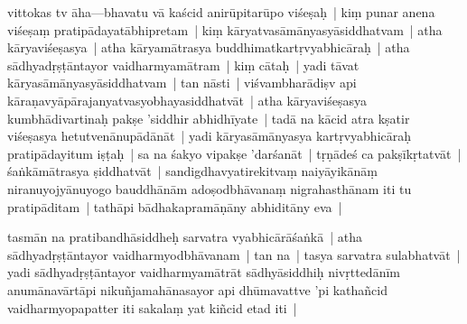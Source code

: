 \documentclass[article,a4paper]{memoir}
\begin{document}
	  \pstart {}\label{sarit__ratnakīrtinibandhāvali__141640}vittokas tv ā\-ha—bhavatu vā\- kaścid anirū\-pitarū\-po viśeṣaḥ | kiṃ punar anena viśeṣaṃ pratipā\-dayatā\-bhipretam | kiṃ kā\-ryatvasā\-mā\-nyasyā\-siddhatvam | atha kā\-ryaviśeṣasya | atha kā\-ryamā\-trasya buddhimatkartṛvyabhicā\-raḥ | atha sā\-dhyadṛṣṭā\-ntayor vaidharmyamā\-tram | kiṃ cā\-taḥ | yadi tā\-vat kā\-ryasā\-mā\-nyasyā\-siddhatvam | tan nā\-sti | viśvambharā\-diṣv api kā\-raṇavyā\-pā\-rajanyatvasyobhayasiddhatvā\-t | atha kā\-ryaviśeṣasya kumbhā\-divartinaḥ pakṣe 'siddhir abhidhī\-yate | tadā\- na kā\-cid atra kṣatir viśeṣasya hetutvenā\-nupā\-dā\-nā\-t | yadi kā\-ryasā\-mā\-nyasya kartṛvyabhicā\-raḥ pratipā\-dayitum iṣṭaḥ | sa na śakyo vipakṣe 'darśanā\-t | tṛṇā\-deś ca pakṣī\-kṛtatvā\-t | śaṅkā\-mā\-trasya ṣiddhatvā\-t | sandigdhavyatirekitvaṃ naiyā\-yikā\-nā\-ṃ niranuyojyā\-nuyogo bauddhā\-nā\-m adoṣodbhā\-vanaṃ nigrahasthā\-nam iti tu pratipā\-ditam | tathā\-pi bā\-dhakapramā\-ṇā\-ny abhiditā\-ny eva |
	\pend
      

	  \pstart tasmā\-n na pratibandhā\-siddheḥ sarvatra vyabhicā\-rā\-śaṅkā\- | atha sā\-dhyadṛṣṭā\-ntayor vaidharmyodbhā\-vanam | tan na | tasya sarvatra sulabhatvā\-t | yadi sā\-dhyadṛṣṭā\-ntayor vaidharmyamā\-trā\-t sā\-dhyā\-siddhiḥ nivṛttedā\-nī\-m anumā\-navā\-rtā\-pi nikuñjamahā\-nasayor api dhū\-mavattve 'pi kathañcid vaidharmyopapatter iti sakalaṃ yat kiñcid etad\label{sarit__ratnakīrtinibandhāvali__143038} iti |
	\pend
      
\end{document}
